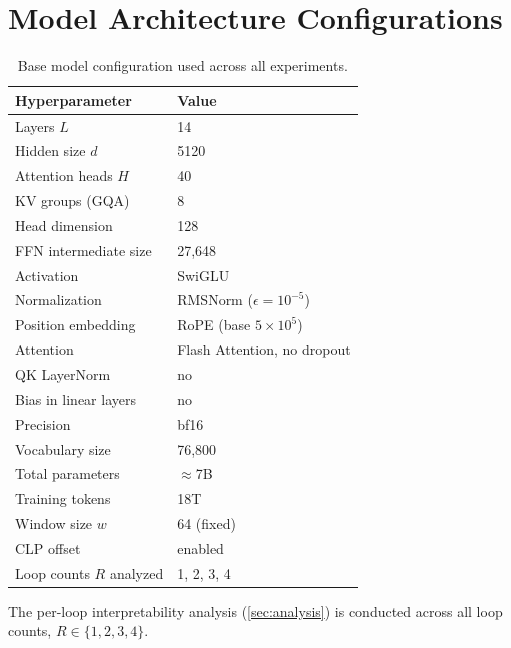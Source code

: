 \documentclass{llmxive}
\providecommand{\loopcount}{R}
\begin{document}
\section{Model Architecture Configurations}
\label{app:model-config}

\begin{table}[!htbp]
\centering
\begin{tabular}{ll}
\toprule
\textbf{Hyperparameter} & \textbf{Value} \\
\midrule
Layers $L$                        & 14 \\
Hidden size $d$                   & 5120 \\
Attention heads $H$               & 40 \\
KV groups (GQA)                   & 8 \\
Head dimension                    & 128 \\
FFN intermediate size             & 27{,}648 \\
Activation                        & SwiGLU \\
Normalization                     & RMSNorm ($\epsilon = 10^{-5}$) \\
Position embedding                & RoPE (base $5\times10^{5}$) \\
Attention                         & Flash Attention, no dropout \\
QK LayerNorm                      & no \\
Bias in linear layers             & no \\
Precision                         & bf16 \\
Vocabulary size                   & 76{,}800 \\
Total parameters                  & $\approx$7B \\
Training tokens                   & 18T \\
Window size $w$                   & 64 (fixed) \\
CLP offset                        & enabled \\
Loop counts $\loopcount$ analyzed & 1, 2, 3, 4 \\
\bottomrule
\end{tabular}
\caption{Base model configuration used across all experiments.}
\label{tab:model-config}
\end{table}

\noindent
The per-loop interpretability analysis (\autoref{sec:analysis}) is
conducted across all loop counts, $\loopcount \in \{1, 2, 3, 4\}$.
\end{document}
